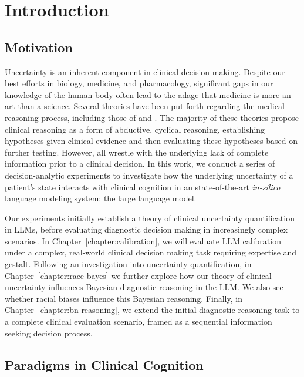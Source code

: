 \chapter{Introduction} \label{chapter:intro}

\section{Motivation}

Uncertainty is an inherent component in clinical decision making. Despite our best efforts in biology, medicine, and pharmacology, significant gaps in our knowledge of the human body often lead to the adage that medicine is more an art than a science. Several theories have been put forth regarding the medical reasoning process, including those of \citet{blois1984information} and \citet{paukerThresholdApproachClinical1980}. The majority of these theories propose clinical reasoning as a form of abductive, cyclical reasoning, establishing hypotheses given clinical evidence and then evaluating these hypotheses based on further testing. However, all wrestle with the underlying lack of complete information prior to a clinical decision. In this work, we conduct a series of decision-analytic experiments to investigate how the underlying uncertainty of a patient's state interacts with clinical cognition in an state-of-the-art \textit{in-silico} language modeling system: the large language model. 

Our experiments initially establish a theory of clinical uncertainty quantification in LLMs, before evaluating diagnostic decision making in increasingly complex scenarios. In Chapter~\ref{chapter:calibration}, we will evaluate LLM calibration under a complex, real-world clinical decision making task requiring expertise and gestalt. Following an investigation into uncertainty quantification, in Chapter~\ref{chapter:race-bayes} we further explore how our theory of clinical uncertainty influences Bayesian diagnostic reasoning in the LLM. We also see whether racial biases influence this Bayesian reasoning. Finally, in Chapter~\ref{chapter:bn-reasoning}, we extend the initial diagnostic reasoning task to a complete clinical evaluation scenario, framed as a sequential information seeking decision process.

\section{Paradigms in Clinical Cognition}

